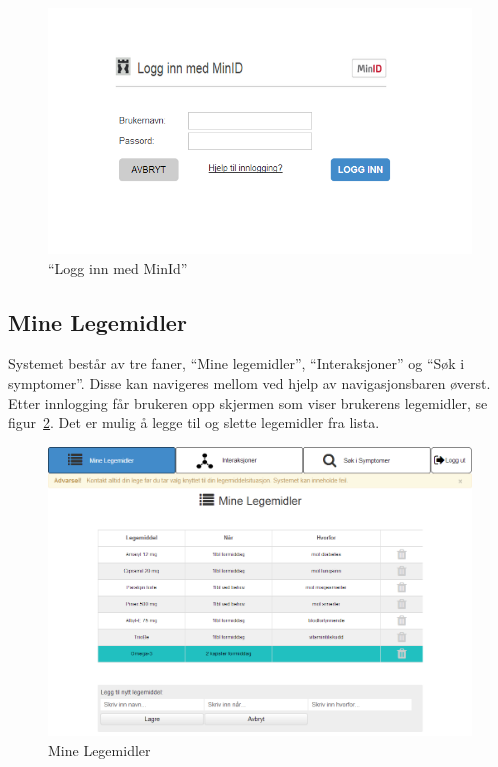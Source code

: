 \begin{figure}[H]
    \includegraphics[width=\textwidth]{fig/utviklingAvPrototype/logginn2.PNG}
    \caption{“Logg inn med MinId”}\label{fig:logginn2}
\end{figure}

\subsection{Mine Legemidler}
Systemet består av tre faner, “Mine legemidler”, “Interaksjoner” og “Søk i symptomer”. Disse kan navigeres mellom ved hjelp av navigasjonsbaren øverst. 
Etter innlogging får brukeren opp skjermen som viser brukerens legemidler, se figur~\ref{fig:mineLegemidler}. Det er mulig å legge til og slette legemidler fra lista.

\begin{figure}[H]
    \centering
    \includegraphics[width=1\textwidth]{fig/utviklingAvPrototype/mineLegemidler.PNG}
    \caption{Mine Legemidler}
    \label{fig:mineLegemidler}
\end{figure} 

